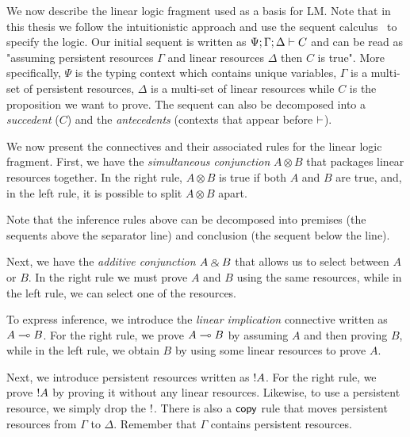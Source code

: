 We now describe the linear logic fragment used as a basis for LM.  Note that in
this thesis we follow the intuitionistic approach and use the sequent
calculus~\cite{gen35} to specify the logic. Our initial sequent is written as
$\Psi; \Gamma ; \Delta \vdash C$ and can be read as "assuming persistent
resources $\Gamma$ and linear resources $\Delta$ then $C$ is true".  More
specifically, $\Psi$ is the typing context which contains unique variables,
$\Gamma$ is a multi-set of persistent resources, $\Delta$ is a multi-set of
linear resources while $C$ is the proposition we want to prove. The sequent can
also be decomposed into a \emph{succedent} ($C$) and the \emph{antecedents}
(contexts that appear before $\vdash$).

We now present the connectives and their associated rules for the linear logic fragment.
First, we have the \emph{simultaneous conjunction} $A \otimes B$ that packages
linear resources together. In the right rule, $A \otimes B$ is true if both $A$
and $B$ are true, and, in the left rule, it is possible to split $A \otimes B$
apart.



Note that the inference rules above can be decomposed into premises (the
sequents above the separator line) and conclusion (the sequent below the line).

Next, we have the \emph{additive conjunction} $A \mathbin{\binampersand} B$ that allows us to
select between $A$ or $B$. In the right rule we must prove $A$ and $B$ using
the same resources, while in the left rule, we can select one of the
resources.



To express inference, we introduce the \emph{linear implication} connective
written as $A \multimap B$. For the right rule, we prove $A \multimap B$ by assuming
$A$ and then proving $B$, while in the left rule, we obtain $B$ by using some
linear resources to prove $A$.



Next, we introduce persistent resources written as ${!} A$. For the right
rule, we prove ${!} A$ by proving it without any linear resources. Likewise,
to use a persistent resource, we simply drop the $
{!}$. There is also a $\mathsf{copy}$ rule that moves persistent resources from
$\Gamma$ to $\Delta$. Remember that $\Gamma$ contains persistent resources.




